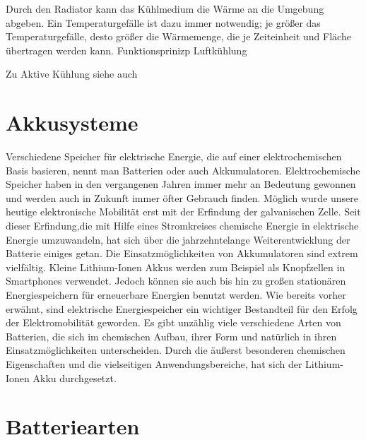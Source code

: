 Durch den Radiator kann das Kühlmedium die Wärme an die Umgebung abgeben. Ein Temperaturgefälle ist dazu immer notwendig; je größer das Temperaturgefälle, desto größer die Wärmemenge, die je Zeiteinheit und Fläche übertragen werden kann.
Funktionsprinizp Luftkühlung

Zu Aktive Kühlung siehe auch \cite{AktiveKuehlung}


\newpage
\section{Akkusysteme}
Verschiedene Speicher für elektrische Energie, die auf einer elektrochemischen Basis basieren, nennt man Batterien oder auch Akkumulatoren. Elektrochemische Speicher haben in den vergangenen Jahren immer mehr an Bedeutung gewonnen und werden auch in Zukunft immer öfter Gebrauch finden. Möglich wurde unsere heutige elektronische Mobilität erst mit der Erfindung der galvanischen Zelle. Seit dieser Erfindung,die mit Hilfe eines Stromkreises chemische Energie in elektrische Energie umzuwandeln, hat sich über die jahrzehntelange Weiterentwicklung der Batterie einiges getan. Die Einsatzmöglichkeiten von Akkumulatoren sind extrem vielfältig. Kleine Lithium-Ionen Akkus werden zum Beispiel als Knopfzellen in Smartphones verwendet. Jedoch können sie auch bis hin zu großen stationären Energiespeichern für erneuerbare Energien benutzt werden. Wie bereits vorher erwähnt, sind elektrische Energiespeicher ein wichtiger Bestandteil für den Erfolg der Elektromobilität geworden. Es gibt unzählig viele verschiedene Arten von Batterien, die sich im chemischen Aufbau, ihrer Form und natürlich in ihren Einsatzmöglichkeiten unterscheiden. Durch die äußerst besonderen chemischen Eigenschaften und die vielseitigen Anwendungsbereiche, hat sich der Lithium-Ionen Akku durchgesetzt.
\newpage

\section{Batteriearten}

